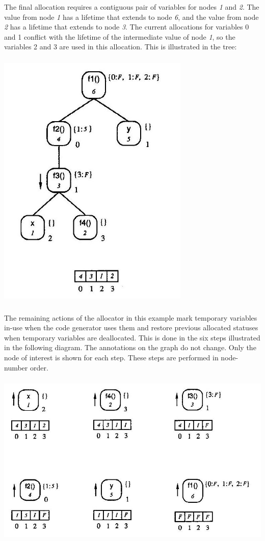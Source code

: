The final allocation requires a contiguous pair of variables for nodes
\textit{1} and \textit{2}. The value from node \textit{1} has a
lifetime that extends to node \textit{6}, and the value from node
\textit{2} has a lifetime that extends to node \textit{3}. The current
allocations for variables 0 and 1 conflict with the lifetime of the
intermediate value of node \textit{1}, so the variables 2 and 3 are
used in this allocation. This is illustrated in the tree:

{\centering{}
\includegraphics[width=3.6in,height=5.0in]{kw/figure8-5.png}
\par}


The remaining actions of the allocator in this example mark temporary
variables in-use when the code generator uses them and restore
previous allocated statuses when temporary variables are
deallocated. This is done in the six steps illustrated in the
following diagram. The annotations on the graph do not change. Only
the node of interest is shown for each step. These steps are performed
in node-number order.

{\centering{}
 \includegraphics[width=6.0in,height=3.3in]{kw/figure8-6.png}  
\par}


